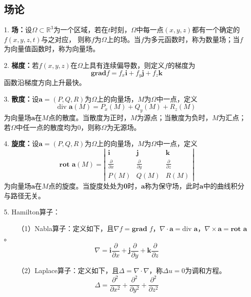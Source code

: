 \subsection{场论}

1. \textbf{场：}设$\Omega\subset \mathbb{R}^3$为一个区域，若在$t$时刻，$\Omega$中每一点$(x,y,z)$都有一个确定的$f(x,y,z,t)$与之对应，
则称$f$为$\Omega$上的场。当$f$为多元函数时，称为数量场；当$f$为向量值函数时，称为向量场。

2. \textbf{梯度：}若$f(x,y,z)$在$\Omega$上具有连续偏导数，则定义$f$的梯度为
\begin{equation*}
    \boldsymbol{grad} f=f_x \boldsymbol{i}+f_y \boldsymbol{j}+f_z\boldsymbol{k}
\end{equation*}
函数沿梯度方向上升最快。

3. \textbf{散度：}设$\boldsymbol{a}=(P,Q,R)$为$\Omega$上的向量场，$M$为$\Omega$中一点，定义
\begin{equation*}
    \text{div } \boldsymbol{a}(M)=P_x(M)+Q_y(M)+R_z(M)
\end{equation*}
为向量场$\boldsymbol{a}$在$M$点的散度。当散度为正时，$M$为源点；当散度为负时，$M$为汇点；若$\Omega$中任一点的散度均为0，则称$\Omega$为无源场。

4. \textbf{旋度：}设$\boldsymbol{a}=(P,Q,R)$为$\Omega$上的向量场，$M$为$\Omega$中一点，定义
\begin{equation*}
    \textbf{rot } \boldsymbol{a}(M)=\left|\begin{matrix}
        \boldsymbol{i} &\boldsymbol{j}&\boldsymbol{k}\\
        \frac{\partial }{\partial x} &\frac{\partial }{\partial y}&\frac{\partial }{\partial z}\\
        P(M)&Q(M)&R(M)  
    \end{matrix}\right|
\end{equation*}
为向量场$\boldsymbol{a}$在$M$点的旋度。当旋度处处为\textbf{0}时，$\textbf{a}$称为保守场，此时$\textbf{a}$中的曲线积分与路径无关。

5. Hamilton算子：

~~~~（1）Nabla算子：定义如下，且$\nabla f=\textbf{grad }f $，$\nabla \cdot \boldsymbol{a}=\text{div }\boldsymbol{a} $，$\nabla \times \boldsymbol{a}=\textbf{rot }\boldsymbol{a} $。
\begin{equation*}
    \nabla = \boldsymbol{i}\frac{\partial }{\partial x}+\boldsymbol{j}\frac{\partial }{\partial y}+\boldsymbol{k}\frac{\partial }{\partial z}
\end{equation*}

~~~~（2）Laplace算子：定义如下，且$\Delta=\nabla \cdot \nabla$，称$\Delta u=0$为调和方程。
\begin{equation*}
    \Delta = \frac{\partial^2}{\partial x^2}+\frac{\partial^2}{\partial y^2}+\frac{\partial^2}{\partial z^2}
\end{equation*}

